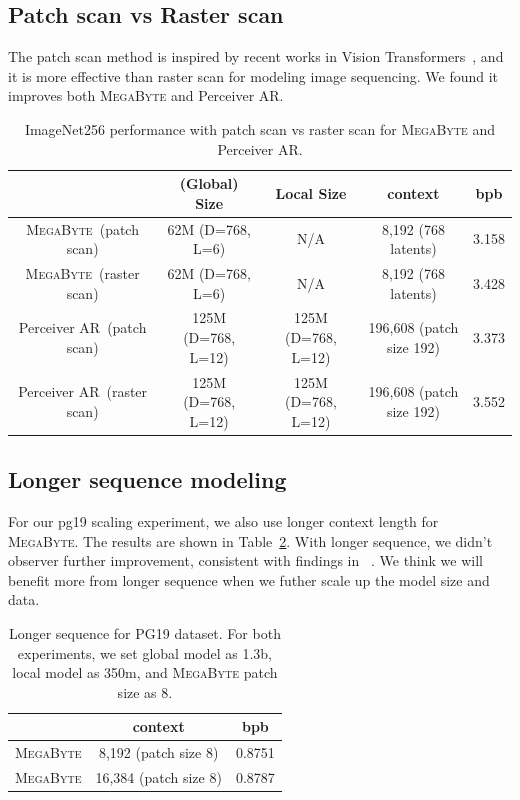 \documentclass{article}
\newcommand{\fastslow}[0]{\textsc{MegaByte}\xspace}
\newcommand{\megabyte}[0]{\fastslow}
\theoremstyle{plain}
\theoremstyle{definition}
\theoremstyle{remark}
\begin{document}
\subsection{Patch scan vs Raster scan}

The patch scan method is inspired by recent works in Vision Transformers~\citep{vit}, and it is more effective than raster scan for modeling image sequencing. We found it improves both \megabyte and Perceiver AR. 
\begin{table}[h]
    \centering\small
    \begin{tabular}{ccccc}
    \toprule
 & (Global) Size & Local Size  & context  & bpb \\
    \midrule
\megabyte~(patch scan) & 62M (D=768, L=6) & N/A  & 8,192 (768 latents)  & 3.158                   \\
\megabyte~(raster scan) & 62M (D=768, L=6) & N/A  & 8,192 (768 latents)  & 3.428                   \\
Perceiver AR~(patch scan)  & 125M (D=768, L=12) & 125M (D=768, L=12) & 196,608 (patch size 192) & 3.373                   \\
Perceiver AR~(raster scan)  & 125M (D=768, L=12) & 125M (D=768, L=12) & 196,608 (patch size 192) & 3.552                  \\
    \bottomrule
    \end{tabular}
    \caption{ImageNet256 performance with patch scan vs raster scan for \megabyte and Perceiver AR.}
    \label{tab:patch_vs_raster}
\end{table}



\subsection{Longer sequence modeling}
\label{sec:long_text}
For our pg19 scaling experiment, we also use longer context length for \megabyte. The results are shown in Table~\ref{tab:longer_seq}. With longer sequence, we didn't observer further improvement, consistent with findings in ~\citet{perceiverar}. We think we will benefit more from longer sequence when we futher scale up the model size and data. 

\begin{table}[h]
    \centering
    \begin{tabular}{ccc}
    \toprule
 & context  & bpb \\
    \midrule
\megabyte &  8,192 (patch size 8)  & 0.8751                 \\
\megabyte &  16,384 (patch size 8)  & 0.8787                  \\
    \bottomrule
    \end{tabular}
    \caption{Longer sequence for PG19 dataset. For both experiments, we set global model as 1.3b, local model as 350m, and \megabyte patch size as 8.}
    \label{tab:longer_seq}
\end{table}
\end{document}

